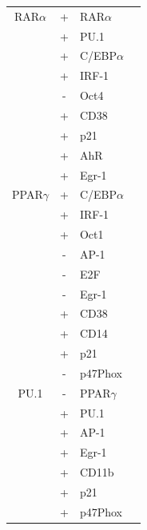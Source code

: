 \documentclass[12pt]{article}
\begin{document}


\clearpage

\begin{center}
\label{tbl:TF-network-connectivity}
\begin{scriptsize}
\begin{supertabular}{c|c|l|l}
\hline
RAR$\alpha$ &  + & RAR$\alpha$ & \cite{Rishi1996} \\
 	&  + & PU.1 & \cite{Mueller2006}\\
 	&  + & C/EBP$\alpha$ & \cite{Friedman2007}\\
 	&  + & IRF-1 & \cite{Luo2006}\\
 	&  - & Oct4 & \cite{Sylvester1994}\\
 	&  + & CD38 & \cite{Drach1994}\\
 	&  + & p21 & \cite{Liu1996}\\
 	&  + & AhR & \cite{Bunaciu2013}\\
 	&  + & Egr-1 & \cite{Balmer2002}\\
\hline
PPAR$\gamma$ &  + & C/EBP$\alpha$ & \cite{Rosen2002}\\
 &  + & IRF-1 & \cite{Varley2009}\\
 &  + & Oct1 & \cite{Bruemmer2003}\\
 &  - & AP-1 & \cite{Delerive1999}\\
 &  - & E2F & \cite{Altiok1997}\\
 &  - & Egr-1 & \cite{Fei2011}\\
 &  + & CD38 & \cite{Song2012}\\
 &  + & CD14 & \cite{Szanto2005}\\
 &  + & p21 & \cite{Han2004}\\
 &  - & p47Phox & \cite{Von-Knethen2002}\\
\hline
PU.1 &  - & PPAR$\gamma$ & \cite{Dispirito2013}\\
&  + & PU.1 & \cite{Chen1995}\\
&  + & AP-1 & \cite{Steidl2006}\\
&  + & Egr-1 & \cite{Laslo2006}\\
&  + & CD11b & \cite{Pahl1993}\\
&  + & p21 & \cite{Yuki2013}\\
&  + & p47Phox & \cite{Li1999}\\

\end{supertabular}
\end{scriptsize}
\end{center}
\end{document}
